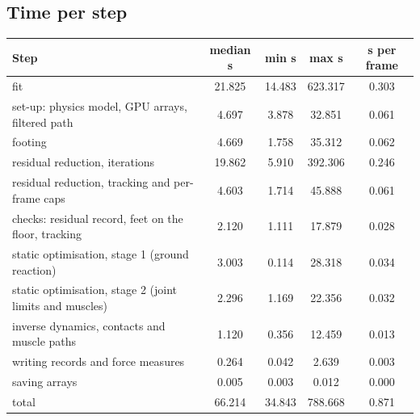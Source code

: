 \documentclass[11pt]{article}
\begin{document}
\subsection{Time per step}
\begin{center}\small
{}
\begin{tabular}{@{}lcccc@{}}
\toprule
Step & median s & min s & max s & s per frame \\
\midrule
fit & 21.825 & 14.483 & 623.317 & 0.303 \\
set-up: physics model, GPU arrays, filtered path & 4.697 & 3.878 & 32.851 & 0.061 \\
footing & 4.669 & 1.758 & 35.312 & 0.062 \\
residual reduction, iterations & 19.862 & 5.910 & 392.306 & 0.246 \\
residual reduction, tracking and per-frame caps & 4.603 & 1.714 & 45.888 & 0.061 \\
checks: residual record, feet on the floor, tracking & 2.120 & 1.111 & 17.879 & 0.028 \\
static optimisation, stage 1 (ground reaction) & 3.003 & 0.114 & 28.318 & 0.034 \\
static optimisation, stage 2 (joint limits and muscles) & 2.296 & 1.169 & 22.356 & 0.032 \\
inverse dynamics, contacts and muscle paths & 1.120 & 0.356 & 12.459 & 0.013 \\
writing records and force measures & 0.264 & 0.042 & 2.639 & 0.003 \\
saving arrays & 0.005 & 0.003 & 0.012 & 0.000 \\
total & 66.214 & 34.843 & 788.668 & 0.871 \\
\bottomrule
\end{tabular}
\end{center}
\end{document}
